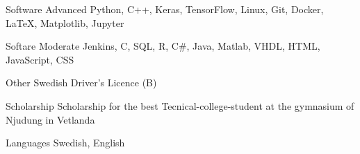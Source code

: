 

\begin{cvskills}

  \cvskill
    {Software Advanced} %
    {Python, C++, Keras, TensorFlow, Linux, Git, Docker, LaTeX, Matplotlib, Jupyter} %

  \cvskill
    {Softare Moderate} %
    {Jenkins, C, SQL, R, C\#, Java, Matlab, VHDL, HTML, JavaScript, CSS} %

  \cvskill
    {Other} %
    {Swedish Driver's Licence (B)} %

  \cvskill
    {Scholarship} %
    {Scholarship for the best Tecnical-college-student at the
    gymnasium of Njudung in Vetlanda} %

  \cvskill
    {Languages} %
    {Swedish, English} %

\end{cvskills}
